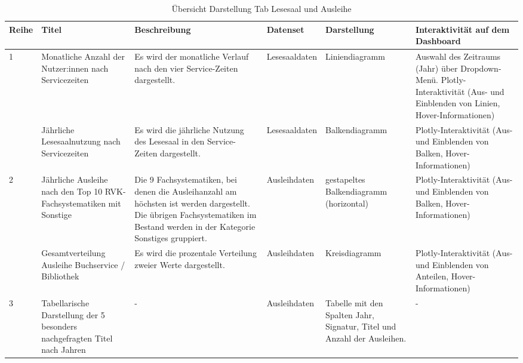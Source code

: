     \begingroup
    \setlength{\tabcolsep}{12pt} %
    \renewcommand{\arraystretch}{1.5} 
    \begin{table}[h]
        \centering
        \begin{adjustbox}{max width=\textwidth}
        \begin{tabular}{p{}p{}p{}p{}p{}p{}}
           \toprule
           Reihe        &Titel &Beschreibung &Datenset &Darstellung &Interaktivität auf dem Dashboard\\
           \midrule
            1           &Monatliche Anzahl der Nutzer:innen nach Servicezeiten&Es wird der monatliche Verlauf nach den vier Service-Zeiten dargestellt.&Lesesaaldaten&Liniendiagramm&Auswahl des Zeitraums (Jahr) über Dropdown-Menü. Plotly-Interaktivität (Aus- und Einblenden von Linien, Hover-Informationen)\\
                        &Jährliche Lesesaalnutzung nach Servicezeiten&Es wird die jährliche Nutzung des Lesesaal in den Service-Zeiten dargestellt.&Lesesaaldaten&Balkendiagramm    &Plotly-Interaktivität (Aus- und Einblenden von Balken, Hover-Informationen)\\          
            \midrule
            2           &Jährliche Ausleihe nach den Top 10 RVK-Fachsystematiken mit Sonstige&Die 9 Fachsystematiken, bei denen die Ausleihanzahl am höchsten ist werden dargestellt. Die übrigen Fachsystematiken im Bestand werden in der Kategorie Sonstiges gruppiert.&Ausleihdaten&gestapeltes Balkendiagramm (horizontal)&Plotly-Interaktivität (Aus- und Einblenden von Balken, Hover-Informationen)\\
                        &Gesamtverteilung Ausleihe Buchservice / Bibliothek&Es wird die prozentale Verteilung zweier Werte dargestellt.&Ausleihdaten    &Kreisdiagramm   &Plotly-Interaktivität (Aus- und Einblenden von Anteilen, Hover-Informationen)\\
            \midrule
            3           &Tabellarische Darstellung der 5 besonders nachgefragten Titel nach Jahren&-&Ausleihdaten    &Tabelle mit den Spalten Jahr, Signatur, Titel und Anzahl der Ausleihen.&-\\

        \bottomrule
        \end{tabular}
        \end{adjustbox}
        \caption{%
            Übersicht Darstellung Tab Lesesaal und Ausleihe
        }
        \label{tab:Darstellung Tab Lesesaal und Ausleihe}
        \end{table}
    \endgroup



